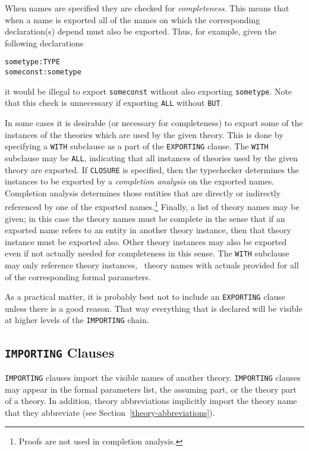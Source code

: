 When names are specified they are checked for \emph{completeness}.
This means that when a name is exported all of the names on which the
corresponding declaration(s) depend must also be exported.  Thus, for
example, given the following declarations
\begin{alltt}
  sometype: TYPE
  someconst: sometype
\end{alltt}
it would be illegal to export \texttt{someconst} without also exporting
\texttt{sometype}.  Note that this check is unnecessary if exporting
\texttt{ALL} without \texttt{BUT}.

In some cases it is desirable (or necessary for completeness) to
export some of the instances of the theories which are used by the
given theory.  This is done by specifying a \texttt{WITH} subclause as a
part of the \texttt{EXPORTING} clause.  The \texttt{WITH} subclause may be
\texttt{ALL}, indicating that all instances of theories used by the given
theory are exported.  If \texttt{CLOSURE} is specified, then the
typechecker determines the instances to be exported by a \emph{
completion analysis} on the exported
names.  Completion analysis determines those entities that are
directly or indirectly referenced by one of the exported
names.\footnote{Proofs are not used in completion analysis.} Finally,
a list of theory names may be given; in this case the theory names
must be complete in the sense that if an exported name refers to an
entity in another theory instance, then that theory instance must be
exported also.  Other theory instances may also be exported even if
not actually needed for completeness in this sense.  The \texttt{WITH}
subclause may only reference theory instances, \ie\ theory names with
actuals provided for all of the corresponding formal parameters.

As a practical matter, it is probably best not to include an
\texttt{EXPORTING} clause unless there is a good reason.  That way
everything that is declared will be visible at higher levels of the
\texttt{IMPORTING} chain.


\subsection{\texttt{IMPORTING} Clauses}

\texttt{IMPORTING} clauses import the visible names of another theory.
\texttt{IMPORTING} clauses may appear in the formal parameters list, the
assuming part, or the theory part of a theory.  In addition, theory
abbreviations implicitly import the theory name that they abbreviate (see
Section~\ref{theory-abbreviations}).

